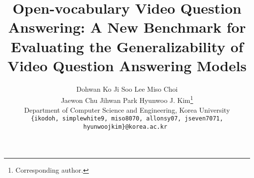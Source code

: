 \documentclass[10pt,twocolumn,letterpaper]{article}
\begin{document}
\title{Open-vocabulary Video Question Answering: A New Benchmark for \\ Evaluating the Generalizability of Video Question Answering Models}


\newcommand*\samethanks[1][\value{footnote}]{\footnotemark[#1]}
\author{
Dohwan Ko\hspace{0.4cm}
Ji Soo Lee\hspace{0.4cm}
Miso Choi\hspace{0.4cm} \\
Jaewon Chu\hspace{0.4cm} 
Jihwan Park\hspace{0.4cm}
Hyunwoo J. Kim\thanks{Corresponding author.}\vspace{0.3cm} \\
Department of Computer Science and Engineering, Korea University\hspace{0.4cm} \\
\tt\small \{ikodoh, simplewhite9, miso8070, allonsy07, jseven7071, hyunwoojkim\}@korea.ac.kr }


\newtheorem{thm}{Theorem}
\newtheorem{rem}[thm]{Remark}

\maketitle
\ificcvfinal\thispagestyle{empty}\fi
\end{document}
